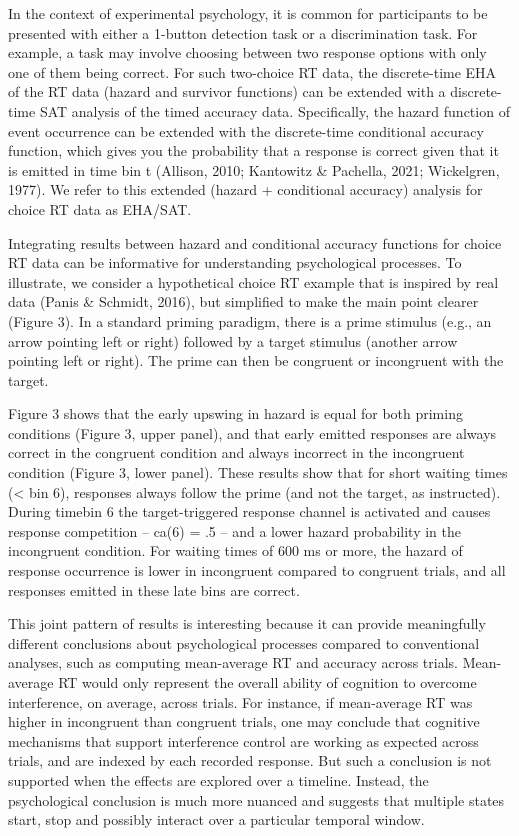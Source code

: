 \documentclass[
  man, donotrepeattitle,floatsintext]{apa6}
\begin{document}
In the context of experimental psychology, it is common for participants to be presented with either a 1-button detection task or a discrimination task. For example, a task may involve choosing between two response options with only one of them being correct. For such two-choice RT data, the discrete-time EHA of the RT data (hazard and survivor functions) can be extended with a discrete-time SAT analysis of the timed accuracy data. Specifically, the hazard function of event occurrence can be extended with the discrete-time conditional accuracy function, which gives you the probability that a response is correct given that it is emitted in time bin t (Allison, 2010; Kantowitz \& Pachella, 2021; Wickelgren, 1977). We refer to this extended (hazard + conditional accuracy) analysis for choice RT data as EHA/SAT.

Integrating results between hazard and conditional accuracy functions for choice RT data can be informative for understanding psychological processes. To illustrate, we consider a hypothetical choice RT example that is inspired by real data (Panis \& Schmidt, 2016), but simplified to make the main point clearer (Figure 3). In a standard priming paradigm, there is a prime stimulus (e.g., an arrow pointing left or right) followed by a target stimulus (another arrow pointing left or right). The prime can then be congruent or incongruent with the target.

Figure 3 shows that the early upswing in hazard is equal for both priming conditions (Figure 3, upper panel), and that early emitted responses are always correct in the congruent condition and always incorrect in the incongruent condition (Figure 3, lower panel). These results show that for short waiting times (\textless{} bin 6), responses always follow the prime (and not the target, as instructed). During timebin 6 the target-triggered response channel is activated and causes response competition -- ca(6) = .5 -- and a lower hazard probability in the incongruent condition. For waiting times of 600 ms or more, the hazard of response occurrence is lower in incongruent compared to congruent trials, and all responses emitted in these late bins are correct.

This joint pattern of results is interesting because it can provide meaningfully different conclusions about psychological processes compared to conventional analyses, such as computing mean-average RT and accuracy across trials. Mean-average RT would only represent the overall ability of cognition to overcome interference, on average, across trials. For instance, if mean-average RT was higher in incongruent than congruent trials, one may conclude that cognitive mechanisms that support interference control are working as expected across trials, and are indexed by each recorded response. But such a conclusion is not supported when the effects are explored over a timeline. Instead, the psychological conclusion is much more nuanced and suggests that multiple states start, stop and possibly interact over a particular temporal window.
\end{document}
